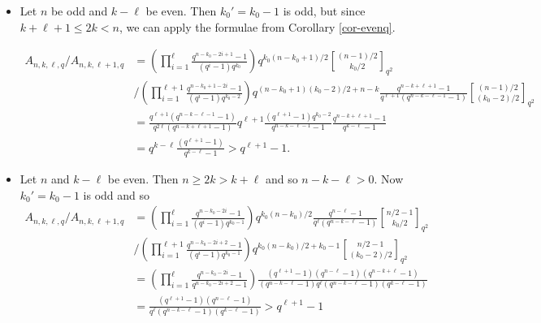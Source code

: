 \documentclass[a4paper,11pt]{article}
\begin{document}
\begin{itemize}
\item Let $n$ be odd and $k-\ell$ be even. Then $k_0'=k_0-1$ is odd, but since $k+\ell+1\le 2k<n$, we can apply the formulae from Corollary \ref{cor-evenq}.

\begin{align*}
  A_{n,k,\ell,q}/A_{n,k,\ell+1,q} & =\left(\prod_{i=1}^\ell\frac{q^{n-k_0-2i+1}-1}{(q^i-1)q^{k_0}}\right)q^{k_0(n-k_0+1)/2}{(n-1)/2\brack k_0/2 }_{q^2}\\ &/\left(\prod_{i=1}^{\ell+1}\frac{q^{n-k_0+1-2i}-1}{(q^i-1)q^{k_0-2}}\right)q^{(n-k_0+1)(k_0-2)/2+n-k}\frac{q^{n-k+\ell+1}-1}{q^{\ell+1}(q^{n-k-\ell-1}-1)}{(n-1)/2\brack(k_0-2)/2 }_{q^2} \\
  & =\frac{q^{\ell+1}(q^{n-k-\ell-1}-1)}{q^{2\ell}(q^{n-k+\ell+1}-1)}q^{\ell+1}\frac{(q^{\ell+1}-1)q^{k_0-2}}{q^{n-k-\ell-1}-1}\frac{q^{n-k+\ell+1}-1}{q^{k-\ell}-1} \\
  & =q^{k-\ell}\frac{(q^{\ell+1}-1)}{q^{k-\ell}-1}>q^{\ell+1}-1.
\end{align*}



\item Let $n$ and $k-\ell$ be even. Then $n\ge 2k>k+\ell$ and so $n-k-\ell>0$. Now $k_0'=k_0-1$ is odd and so %
\begin{align*}
  A_{n,k,\ell,q}/A_{n,k,\ell+1,q} & =\left(\prod_{i=1}^{\ell}\frac{q^{n-k_0-2i}-1}{(q^i-1)q^{k_0-1}}\right)q^{k_0(n-k_0)/2}\frac{q^{n-\ell}-1}{q^{\ell}(q^{n-k-\ell}-1)}{n/2-1\brack k_0/2 }_{q^2}\\ &/\left(\prod_{i=1}^{\ell+1}\frac{q^{n-k_0-2i+2}-1}{(q^i-1)q^{k_0-1}}\right)q^{k_0(n-k_0)/2+k_0-1}{n/2-1\brack(k_0-2)/2 }_{q^2} \\
  &=\left(\prod_{i=1}^{\ell}\frac{q^{n-k_0-2i}-1}{q^{n-k_0-2i+2}-1}\right)\frac{(q^{\ell+1}-1)(q^{n-\ell}-1)(q^{n-k+\ell}-1)}{(q^{n-k-\ell}-1)
  q^{\ell}(q^{n-k-\ell}-1)(q^{k-\ell}-1)}\\
   &=\frac{(q^{\ell+1}-1)(q^{n-\ell}-1)}{q^{\ell}(q^{n-k-\ell}-1)(q^{k-\ell}-1)}>q^{\ell+1}-1
\end{align*}
\end{itemize}
\end{document}

